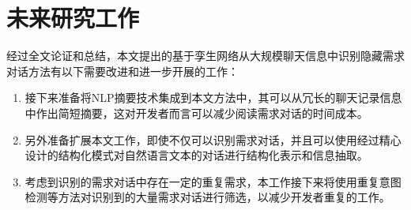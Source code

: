 \section{未来研究工作}
经过全文论证和总结，本文提出的基于孪生网络从大规模聊天信息中识别隐藏需求对话方法有以下需要改进和进一步开展的工作：
\begin{enumerate}
    \item 接下来准备将NLP摘要技术集成到本文方法中，其可以从冗长的聊天记录信息中作出简短摘要，这对开发者而言可以减少阅读需求对话的时间成本。
    \item 另外准备扩展本文工作，即使{\tool}不仅可以识别需求对话，并且可以使用经过精心设计的结构化模式对自然语言文本的对话进行结构化表示和信息抽取。
    \item 考虑到识别的需求对话中存在一定的重复需求，本工作接下来将使用重复意图检测等方法对识别到的大量需求对话进行筛选，以减少开发者重复的工作。
\end{enumerate}